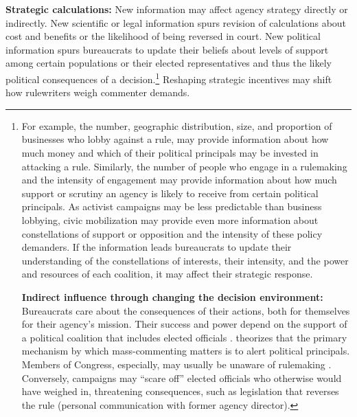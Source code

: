 \textbf{Strategic calculations:} 
New information may affect agency strategy directly or indirectly. New scientific or legal information spurs revision of calculations about cost and benefits or the likelihood of being reversed in court. New political information spurs bureaucrats to update their beliefs about levels of support among certain populations or their elected representatives and thus the likely political consequences of a decision.\footnote{
For example, the number, geographic distribution, size, and proportion of businesses who lobby against a rule, may provide information about how much money and which of their political principals may be invested in attacking a rule. Similarly, the number of people who engage in a rulemaking and the intensity of engagement may provide information about how much support or scrutiny an agency is likely to receive from certain political principals. 
As activist campaigns may be less predictable than business lobbying, civic mobilization may provide even more information about constellations of support or opposition and the intensity of these policy demanders. 
If the information leads bureaucrats to update their understanding of the constellations of interests, their intensity, and the power and resources of each coalition, it may affect their strategic response.

\textbf{Indirect influence through changing the decision environment:} 
Bureaucrats care about the consequences of their actions, both for themselves for their agency’s mission. Their success and power depend on the support of a political coalition that includes elected officials \citep{Carpenter2001}. \citet{West2004} theorizes that the primary mechanism by which mass-commenting matters is to alert political principals. Members of Congress, especially, may usually be unaware of rulemaking \citep{Nou2016}. Conversely, campaigns may ``scare off'' elected officials who otherwise would have weighed in, threatening consequences, such as legislation that reverses the rule (personal communication with former agency director).
}
Reshaping strategic incentives may shift how rulewriters weigh commenter demands.


